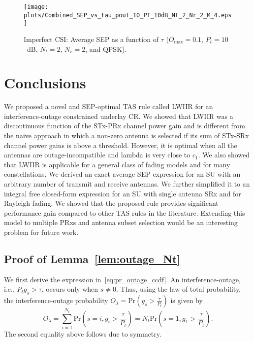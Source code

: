 \documentclass[12pt,draftcls,peerreview,onecolumn]{IEEEtran}
\newcommand{\brac}[1]{\left({#1}\right)}
\newcommand{\prob}[1]{\text{Pr}\brac{#1}}
\newcommand{\lam}{\lambda}
\newcommand{\Nt}{{N_t}}
\newcommand{\Nr}{{N_r}}
\newcommand{\Pt}{{P_t}}
\newcommand{\puch}{g}
\newcommand{\gk}[1]{{\puch_{#1}}}
\newcommand{\outmax}{O_{\text{max}}}
\newcommand{\itau}{\tau}
\newcommand{\cone}{c_{1}}
\newcommand{\out}{O}
\newcommand{\taubypt}{\frac{\itau}{\Pt}}
\newcommand{\gkgrtaubypt}[1]{{\gk{#1}}>\taubypt}
\newcommand{\outlam}{\out_{\lam}}
\begin{document}
\begin{figure}
	\centering \texttt{[image: plots/Combined\_SEP\_vs\_tau\_pout\_10\_PT\_10dB\_Nt\_2\_Nr\_2\_M\_4.eps]}
	\caption{Imperfect CSI: Average SEP as a function of $\itau$ ($\outmax=0.1$, $\Pt = 10$~dB, $\Nt = 2$, $\Nr = 2$, and QPSK).}
	\label{fig:sep_vs_tau_imp_CSI}
\end{figure}




\section{Conclusions}
\label{sec:conclusions}
We proposed a novel and SEP-optimal TAS rule called LWIIR for an interference-outage constrained underlay CR. We showed that LWIIR was a discontinuous function of the STx-PRx channel power gain and is different from the naive approach in which a non-zero antenna is selected if its sum of STx-SRx channel power gains is above a threshold. However, it is optimal when all the antennas are outage-incompatible and lambda is very close to $\cone$. We also showed that LWIIR is applicable for a general class of fading models and for many constellations. We derived an exact average SEP expression for an SU with an arbitrary number of transmit and receive antennas. We further simplified it to an integral free closed-form expression for an SU with single antenna SRx and for Rayleigh fading. We showed that the proposed rule provides significant performance gain compared to other TAS rules in the literature. Extending this model to multiple PRxs and antenna subset selection would be an interesting problem for future work.

\appendix
\subsection{Proof of Lemma~\ref{lem:outage_Nt}}
\label{proof:outage_Nt}
We first derive the expression in~\eqref{eq:pr_outage_ccdf}. An interference-outage, i.e., $\Pt \gk{s} > \itau$, occurs only when $s\neq0$. Thus, using the law of total probability, the interference-outage probability $\outlam = \prob{\gkgrtaubypt{s}}$ is given by
%
\begin{equation}
\outlam =  \sum_{i=1}^{\Nt}\text{Pr}\brac{s=i,\gk{i}>\taubypt}=\Nt\text{Pr}\brac{s=1,\gk{1}>\taubypt}.
\label{eq:out_1}
\end{equation}
%
The second equality above follows due to symmetry.
\end{document}
